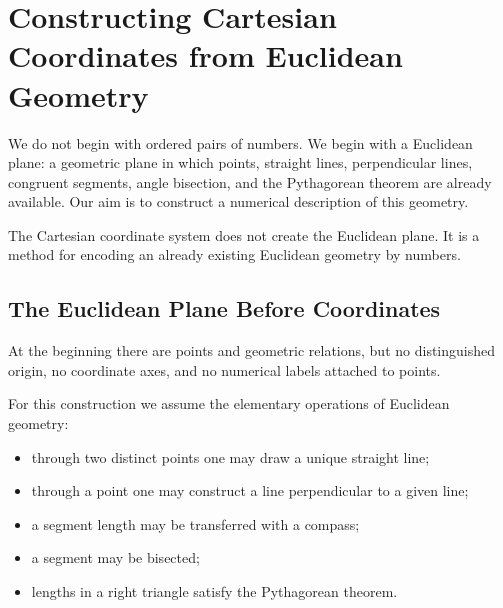 \section{Constructing Cartesian Coordinates from Euclidean Geometry}

We do not begin with ordered pairs of numbers.  We begin with a Euclidean
plane: a geometric plane in which points, straight lines, perpendicular lines,
congruent segments, angle bisection, and the Pythagorean theorem are already
available.  Our aim is to construct a numerical description of this geometry.

\begin{remarkbox}
The Cartesian coordinate system does not create the Euclidean plane.  It is a
method for encoding an already existing Euclidean geometry by numbers.
\end{remarkbox}

\subsection{The Euclidean Plane Before Coordinates}

At the beginning there are points and geometric relations, but no distinguished
origin, no coordinate axes, and no numerical labels attached to points.

\begin{center}
\end{center}

\begin{definitionbox}
For this construction we assume the elementary operations of Euclidean
geometry:
\begin{itemize}
    \item through two distinct points one may draw a unique straight line;
    \item through a point one may construct a line perpendicular to a given line;
    \item a segment length may be transferred with a compass;
    \item a segment may be bisected;
    \item lengths in a right triangle satisfy the Pythagorean theorem.
\end{itemize}
\end{definitionbox}

